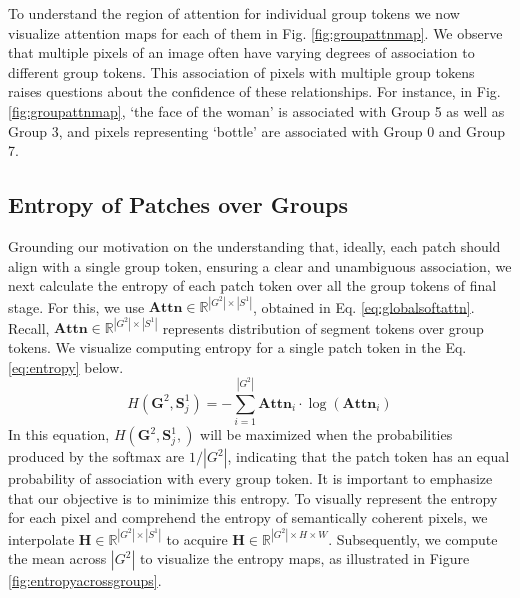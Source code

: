 To understand the region of attention for individual group tokens we now visualize attention maps for each of them in Fig. \ref{fig:groupattnmap}. We observe that multiple pixels of an image often have varying degrees of association to different group tokens. This association of pixels with multiple group tokens raises questions about the confidence of these relationships. For instance, in Fig. \ref{fig:groupattnmap}, `the face of the woman' is associated with Group 5 as well as Group 3, and pixels representing `bottle' are associated with Group 0 and Group 7. 
 
 \subsection{Entropy of Patches over Groups}
 \label{sec:groupentropy}
 Grounding our motivation on the understanding that, ideally, each patch should align with a single group token, ensuring a clear and unambiguous association, we next 
calculate the entropy of each patch token over all the group tokens of final stage. For this, we use $\textbf{Attn} \in \mathbb{R}^{|G^2| \times |S^1|}$, obtained in Eq. \ref{eq:globalsoftattn}. Recall, $\textbf{Attn} \in \mathbb{R}^{|G^2| \times |S^1|}$ represents distribution of segment tokens over group tokens. We visualize computing entropy for a single patch token in the Eq. \ref{eq:entropy} below. 
\begin{equation}
\label{eq:entropy}
H(\textbf{G}^2, \textbf{S}^1_j) = -\sum_{i=1}^{|G^2|} \text{$\textbf{Attn}_{i}$} \cdot \log(\text{$\textbf{Attn}_{i}$})
\end{equation}
In this equation, $H( \textbf{G}^2, \textbf{S}^1_j,)$ will be maximized when the probabilities produced by the softmax are $1/|G^2|$, indicating that the patch token has an equal probability of association with every group token. It is important to emphasize that our objective is to minimize this entropy. To visually represent the entropy for each pixel and comprehend the entropy of semantically coherent pixels, we interpolate $\textbf{H} \in \mathbb{R}^{|G^2| \times |S^1|}$ to acquire $\textbf{H} \in \mathbb{R}^{|G^2| \times H \times W}$. Subsequently, we compute the mean across $|G^2|$ to visualize the entropy maps, as illustrated in Figure \ref{fig:entropyacrossgroups}.


